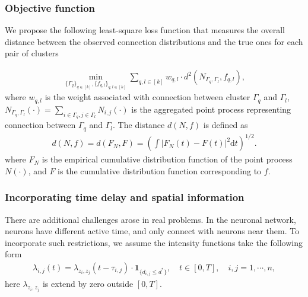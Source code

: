 \subsubsection*{Objective function}

We propose the following least-square loss function that measures the overall distance between the observed connection distributions and the true ones for each pair of clusters

\begin{align}
	\min_{\{\Gamma_q\}_{q\in[k]}, \{f_{q,l}\}_{q,l\in[k]}} 
	\sum_{q,l\in[k]}
	w_{q,l}\cdot
	d^2(N_{\Gamma_q, \Gamma_l}, f_{q,l}),
	\label{eq: objective function}
\end{align}
where $w_{q,l}$ is the weight associated with connection between cluster $\Gamma_q$ and $\Gamma_l$, $N_{\Gamma_q, \Gamma_l}(\cdot)=\sum_{i\in\Gamma_q,j\in\Gamma_l}N_{i,j}(\cdot)$ is the aggregated point process representing connection between $\Gamma_q$ and $\Gamma_l$. 
The distance $d(N, f)$ is defined as
\begin{align*}
d(N, f) = d(F_N, F) = \left( \int |F_N(t) - F(t)|^2 \text{d}t \right) ^{1/2}.
\end{align*}
where $F_N$ is the empirical cumulative distribution function of the point process $N(\cdot)$, and $F$ is the cumulative distribution function corresponding to $f$.



\subsubsection*{Incorporating time delay and spatial information}
There are additional challenges arose in real problems.
In the neuronal network, neurons have different active time, and only connect with neurons near them.
To incorporate such restrictions, we assume the intensity functions take the following form
\begin{align*}
\lambda_{i,j}(t) = \lambda_{z_i,z_j}(t-\tau_{i,j})\cdot \mathbf{1}_{\{d_{i,j}\leq d^*\}}, 
\quad t\in[0,T], \quad i,j=1,\cdots,n,
\end{align*}
here $\lambda_{z_i,z_j}$ is extend by zero outside $[0,T]$.


